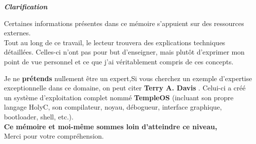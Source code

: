 \thispagestyle{empty}
\vspace*{2cm}
\begin{center}
    \huge{\textbf{\textit{Clarification}}}
\end{center}
\vspace{2cm}
\begin{center}
\large{

Certaines informations présentes dans ce mémoire s'appuient sur des ressources externes.\\

Tout au long de ce travail,  le lecteur trouvera des explications techniques détaillées. Celles-ci n'ont pas pour but d'enseigner, mais plutôt d'exprimer mon point de vue personnel  et ce que j'ai véritablement compris de ces concepts.\\
\bigbreak

 Je ne \textbf{prétends} nullement être un expert,Si vous cherchez un exemple d'expertise exceptionnelle dans ce domaine, on peut citer \textbf{Terry A. Davis} \cite{terry_davis}. Celui-ci a créé un système d’exploitation complet nommé \textbf{TempleOS} (incluant son propre langage HolyC, son compilateur, noyau, débogueur, interface graphique, bootloader, shell, etc.).\\
\bigbreak
\bigbreak
\textbf{Ce mémoire et moi-même sommes loin d'atteindre ce niveau,}\\ 
Merci pour votre compréhension.
}
\end{center}
\clearpage